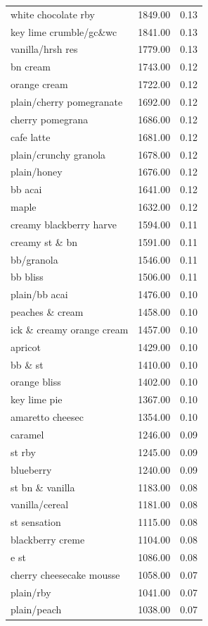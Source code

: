 \begin{table}
\begin{tabular}{lrr}
white chocolate rby & 1849.00 & 0.13 \\
key lime crumble/gc\&wc & 1841.00 & 0.13 \\
vanilla/hrsh res & 1779.00 & 0.13 \\
bn cream & 1743.00 & 0.12 \\
orange cream & 1722.00 & 0.12 \\
plain/cherry pomegranate & 1692.00 & 0.12 \\
cherry pomegrana & 1686.00 & 0.12 \\
cafe latte & 1681.00 & 0.12 \\
plain/crunchy granola & 1678.00 & 0.12 \\
plain/honey & 1676.00 & 0.12 \\
bb acai & 1641.00 & 0.12 \\
maple & 1632.00 & 0.12 \\
creamy blackberry harve & 1594.00 & 0.11 \\
creamy st \& bn & 1591.00 & 0.11 \\
bb/granola & 1546.00 & 0.11 \\
bb bliss & 1506.00 & 0.11 \\
plain/bb acai & 1476.00 & 0.10 \\
peaches \& cream & 1458.00 & 0.10 \\
ick \& creamy orange cream & 1457.00 & 0.10 \\
apricot & 1429.00 & 0.10 \\
bb \& st & 1410.00 & 0.10 \\
orange bliss & 1402.00 & 0.10 \\
key lime pie & 1367.00 & 0.10 \\
amaretto cheesec & 1354.00 & 0.10 \\
caramel & 1246.00 & 0.09 \\
st rby & 1245.00 & 0.09 \\
blueberry & 1240.00 & 0.09 \\
st bn \& vanilla & 1183.00 & 0.08 \\
vanilla/cereal & 1181.00 & 0.08 \\
st sensation & 1115.00 & 0.08 \\
blackberry creme & 1104.00 & 0.08 \\
e st & 1086.00 & 0.08 \\
cherry cheesecake mousse & 1058.00 & 0.07 \\
plain/rby & 1041.00 & 0.07 \\
plain/peach & 1038.00 & 0.07 \\

\end{tabular}
\end{table}
